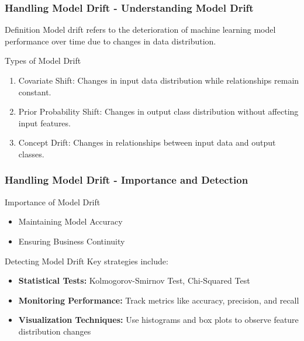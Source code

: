 \documentclass[aspectratio=169]{beamer}
\begin{document}
\begin{frame}[fragile]
    \frametitle{Handling Model Drift - Understanding Model Drift}
    
    \begin{block}{Definition}
        Model drift refers to the deterioration of machine learning model performance over time due to changes in data distribution.
    \end{block}
    
    \begin{block}{Types of Model Drift}
        \begin{enumerate}
            \item Covariate Shift: Changes in input data distribution while relationships remain constant.
            \item Prior Probability Shift: Changes in output class distribution without affecting input features.
            \item Concept Drift: Changes in relationships between input data and output classes.
        \end{enumerate}
    \end{block}
\end{frame}

\begin{frame}[fragile]
    \frametitle{Handling Model Drift - Importance and Detection}
    
    \begin{block}{Importance of Model Drift}
        \begin{itemize}
            \item Maintaining Model Accuracy
            \item Ensuring Business Continuity
        \end{itemize}
    \end{block}
    
    \begin{block}{Detecting Model Drift}
        Key strategies include:
        \begin{itemize}
            \item \textbf{Statistical Tests:} Kolmogorov-Smirnov Test, Chi-Squared Test
            \item \textbf{Monitoring Performance:} Track metrics like accuracy, precision, and recall
            \item \textbf{Visualization Techniques:} Use histograms and box plots to observe feature distribution changes
        \end{itemize}
    \end{block}
\end{frame}
\end{document}
